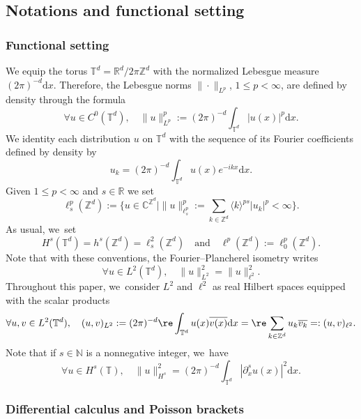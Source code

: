 \documentclass[10pt,a4paper]{amsart}
\let\ts\textstyle
\theoremstyle{plain}
\theoremstyle{definition}
\newcommand{\1}{\mathbf{1}}
\providecommand{\Subsection}{\subsection}
\begin{document}
\Subsection{Notations and functional setting}
\label{sec:notations}
\subsubsection{Functional setting}
\label{sec:fun}
We equip the torus $\mathbb{T}^d = \mathbb{R}^d / 2\pi \mathbb{Z}^d$ with the normalized Lebesgue measure $(2\pi)^{-d}\mathrm{d}x$. Therefore, the Lebesgue norms $\|\cdot\|_{L^p}$, $1\leq p<\infty$, are defined by density through the formula\vspace*{-3pt}
\[
\forall u \in C^0(\mathbb{T}^d), \quad \| u\|_{L^p}^p:= (2\pi)^{-d}\int_{\mathbb{T}^d} |u(x)|^p \mathrm{d}x.
\]
We identity each distribution $u$ on $\mathbb{T}^d$ with the sequence of its Fourier coefficients defined by density by\vspace*{-3pt}
\[
u_k = (2\pi)^{-d} \int_{\mathbb{T}^d} u(x) e^{-ikx} \mathrm{d}x.
\]
Given $1\leq p < \infty$ and $s\in \mathbb{R}$ we set
\[
\ts
\ell^{p}_s(\mathbb{Z}^d):= \bigl\{ u\in \mathbb{C}^{\mathbb{Z}^d} \mid \|u\|_{\ell^p_s}^p := \sum_{k\in \mathbb{Z}^d} \langle k \rangle^{ps} |u_k|^p <\infty \bigr\}.
\]
As usual, we~set
\[
H^s(\mathbb{T}^d) = h^s(\mathbb{Z}^d) = \ell^2_s(\mathbb{Z}^d) \quad \mathrm{and} \quad \ell^p(\mathbb{Z}^d) := \ell^p_0(\mathbb{Z}^d).
\]
Note that with these conventions, the Fourier--Plancherel isometry writes
\[
\forall u \in L^2(\mathbb{T}^d), \quad \| u\|_{L^2}^2 = \|u\|_{\ell^2}^2.
\]
Throughout this paper, we~consider $L^2$ and $\ell^2$ as real Hilbert spaces equipped with the scalar products
\[
\forall u,v\in L^2(\mathbb{T}^d), \quad (u,v)_{L^2} :=(2\pi)^{-d} \re \int_{\mathbb{T}^d} u(x) \overline{v(x)} \mathrm{d}x = \re \sum_{k\in \mathbb{Z}^d} u_k \overline{v_k} =: (u,v)_{\ell^2}.
\]
Note that if $s \in \mathbb{N}$ is a nonnegative integer, we~have
\[
\forall u \in H^s(\mathbb{T}), \quad \|u\|_{H^s}^2 = (2\pi)^{-d} \int_{\mathbb{T}^d} |\partial_x^s u(x)|^2 \mathrm{d}x.
\]

\subsubsection{Differential calculus and Poisson brackets}
\end{document}

